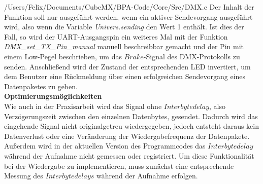 
{/Users/Felix/Documents/CubeMX/BPA-Code/Core/Src/DMX.c}
Der Inhalt der Funktion soll nur ausgeführt werden, wenn ein aktiver Sendevorgang ausgeführt wird, also wenn die Variable \textit{Univers.sending} den Wert 1 enthält. Ist dies der Fall, so wird der UART-Ausgangspin ein weiteres Mal mit der Funktion \textit{DMX\_set\_TX\_Pin\_manual} manuell beschreibbar gemacht und der Pin mit einem Low-Pegel beschrieben, um das $Brake$-Signal des DMX-Protokolls zu senden. Anschließend wird der Zustand der entsprechenden LED invertiert, um dem Benutzer eine Rückmeldung über einen erfolgreichen Sendevorgang eines Datenpaketes zu geben.\\
\newline
\textbf{Optimierungsmöglichkeiten}\\
Wie auch in der Praxisarbeit wird das Signal ohne $Interbytedelay$, also Verzögerungszeit zwischen den einzelnen Datenbytes, gesendet. Dadurch wird das eingehende Signal nicht originalgetreu wiedergegeben, jedoch entsteht daraus kein Datenverlust oder eine Veränderung der Wiedergabefrequenz der Datenpakete. Außerdem wird in der aktuellen Version des Programmcodes das $Interbytedelay$ während der Aufnahme nicht gemessen oder registriert. Um diese Funktionalität bei der Wiedergabe zu implementieren, muss zunächst eine entsprechende Messung des $Interbytedelays$ während der Aufnahme erfolgen.